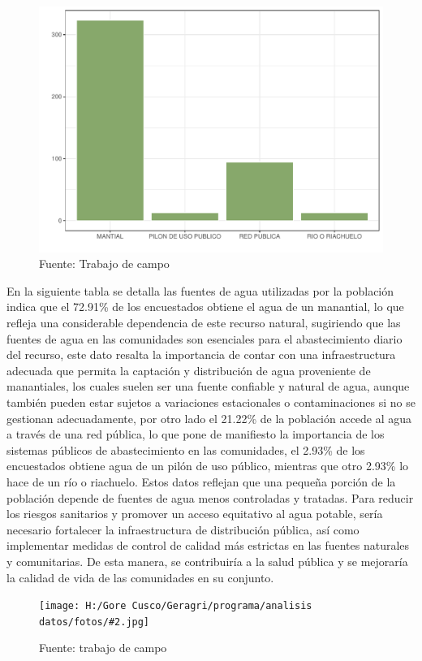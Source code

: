 \documentclass{article}\usepackage[]{graphicx}\usepackage[table]{xcolor}
\makeatletter
\def\maxwidth{ %
  \ifdim\Gin@nat@width>\linewidth
    \linewidth
  \else
    \Gin@nat@width
  \fi
}
\newenvironment{knitrout}{}{} %
\newenvironment{fotos}[2]
{\begin{figure}[H]
	\centering
	\caption{#1}
	\texttt{[image: H:/Gore Cusco/Geragri/programa/analisis datos/fotos/\#2.jpg]}
	\caption*{Fuente: trabajo de campo}}
{\end{figure}}
\makeatother
\begin{document}
\begin{figure}[H]
  \centering
  \caption{Fuente de agua}
\begin{knitrout}
\color{fgcolor}
\includegraphics[width=\maxwidth]{figure/fig_once-1} 
\end{knitrout}
  \caption*{Fuente: Trabajo de campo}
\end{figure}
En la siguiente tabla se detalla las fuentes de agua utilizadas por la población indica  que el 72.91\% de los encuestados obtiene el agua de un manantial, lo que refleja una considerable dependencia de este recurso natural, sugiriendo que las fuentes de agua en las comunidades son esenciales para el abastecimiento diario del recurso, este dato resalta la importancia de contar con una infraestructura adecuada que permita la captación y distribución de agua proveniente de manantiales, los cuales suelen ser una fuente confiable y natural de agua, aunque también pueden estar sujetos a variaciones estacionales o contaminaciones si no se gestionan adecuadamente, por otro lado el 21.22\% de la población accede al agua a través de una red pública, lo que pone de manifiesto la importancia de los sistemas públicos de abastecimiento en las comunidades, el 2.93\% de los encuestados obtiene agua de un pilón de uso público, mientras que otro 2.93\% lo hace de un río o riachuelo. Estos datos reflejan que una pequeña porción de la población depende de fuentes de agua menos controladas y tratadas. Para reducir los riesgos sanitarios y promover un acceso equitativo al agua potable, sería necesario fortalecer la infraestructura de distribución pública, así como implementar medidas de control de calidad más estrictas en las fuentes naturales y comunitarias. De esta manera, se contribuiría a la salud pública y se mejoraría la calidad de vida de las comunidades en su conjunto.
\begin{fotos}
{sensibilizacion a la poblacion}{9}
\end{fotos}
\end{document}
